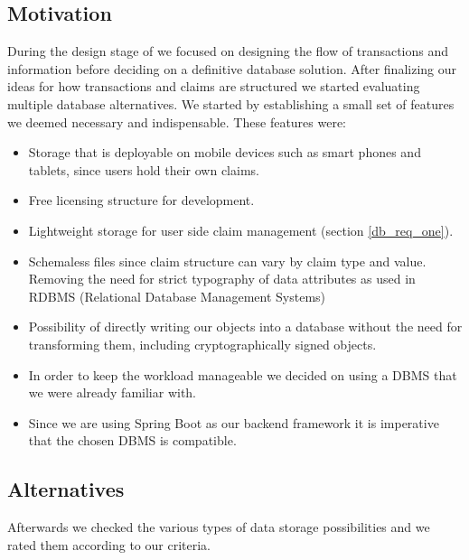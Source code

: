 \subsection{Motivation}
\label{sec:databaseMotivation}
During the design stage of \projectName{} we focused on designing the flow of transactions and information before
deciding on a definitive database solution.
After finalizing our ideas for how transactions and claims are structured we started evaluating multiple database alternatives.
We started by establishing a small set of features we deemed necessary and indispensable. These features were:
\begin{itemize}
\item \label{db_req_one}
Storage that is deployable on mobile devices such as smart phones and tablets, since users hold their own claims.
\item \label{db_req_two}
Free licensing structure for development.
\item \label{db_item_three}
Lightweight storage for user side claim management (section \ref{db_req_one}).
\item \label{db_req_four}
Schemaless files since claim structure can vary by claim type and value. Removing the need for strict typography of data
 attributes as used in RDBMS (Relational Database Management Systems)
\item \label{db_req_five}
Possibility of directly writing our objects into a database without the need for transforming them, including
cryptographically signed objects.
\item \label{db_req_six}
In order to keep the workload manageable we decided on using a DBMS that we were already familiar with.
\item \label{db_req_seven}
Since we are using Spring Boot as our backend framework it is imperative that the chosen DBMS is compatible.
\end{itemize}

\subsection{Alternatives}
\label{sec:databaseAlternatives}
Afterwards we checked the various types of data storage possibilities and we rated them according to our criteria.

